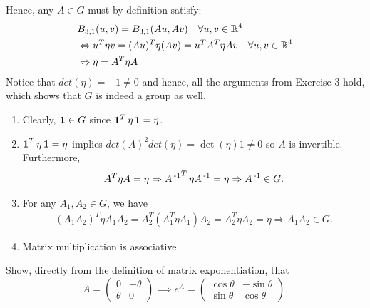 \documentclass[11pt,onecolumn]{article}
\newcommand{\bl}{B_{3,1}}
\begin{document}
\begin{answer}
Hence, any $A \in G$ must by definition satisfy:
\begin{align*}
    &\bl(u,v) = \bl(Au,Av) \quad \forall u,v \in \real^4 \\
    &\Leftrightarrow u^T\eta v = (Au)^T\eta (Av) = u^TA^T\eta Av \quad \forall u,v \in \real^4 \\
    &\Leftrightarrow \eta = A^T \eta A 
\end{align*}
Notice that $det(\eta) = -1 \neq 0$ and hence, all the arguments from Exercise 3 hold, which shows that $G$ is indeed a group as well.
\begin{enumerate}
    \item Clearly, $\operatorname{\mathbf{1}} \in G$ since $\operatorname{\mathbf{1}}^T \eta \operatorname{\mathbf{1}} = \eta$.
    \item $\operatorname{\mathbf{1}}^T \eta \operatorname{\mathbf{1}} = \eta$ implies $det(A)^2 det(\eta) = \det(\eta) 1 \neq 0$ so $A$ is invertible. Furthermore,
    \begin{align*}
        A^T \eta A = \eta \Rightarrow A\operatorname{^{-1}}^T \eta A\operatorname{^{-1}} = \eta \Rightarrow A\operatorname{^{-1}} \in G.
    \end{align*}
    \item For any $A_1,A_2 \in G$, we have 
    \begin{align*}
        (A_1A_2)^T \eta A_1A_2 = A_2^T(A_1^T\eta A_1)A_2 = A_2^T \eta A_2 = \eta \Rightarrow A_1A_2 \in G.
    \end{align*}
    \item Matrix multiplication is associative.
\end{enumerate}
\end{answer}
\begin{exercise}
 Show, directly from the definition of matrix exponentiation, that $$A=\begin{pmatrix} 0 &- \theta\\ \theta & 0 \end{pmatrix} \implies e^A =\begin{pmatrix} \cos{\theta} & -\sin{\theta}\\ \sin{\theta} & \cos{\theta}\end{pmatrix}.$$
\end{exercise}
\end{document}
